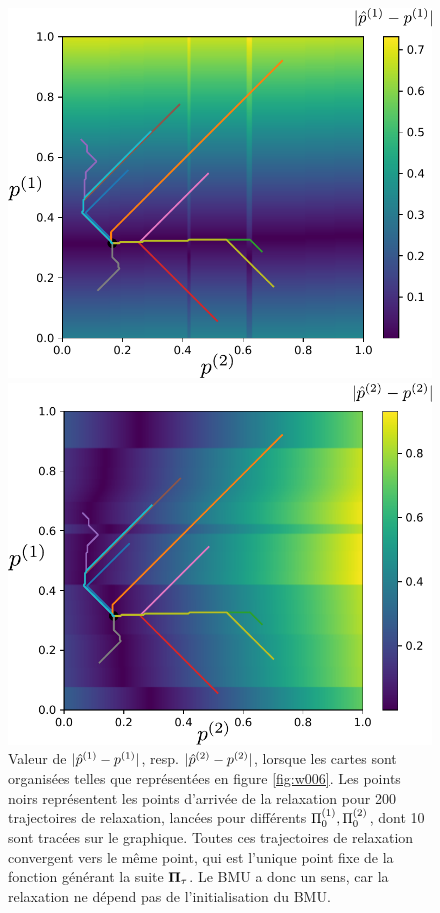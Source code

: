 \documentclass[../main]{subfiles}
\begin{document}
\begin{figure}
	\begin{minipage}{0.5\textwidth}
	\centering
	\includegraphics[width=\textwidth]{champ_X_006.pdf}
	\end{minipage}
	\begin{minipage}{0.5\textwidth}
	\centering
	\includegraphics[width=\textwidth]{champ_Y_006.pdf}
	\end{minipage}
	\caption{Valeur de $\lvert{\hat{p}}^{({1})} - p^{({1})}\rvert$, resp. $\lvert{\hat{p}}^{({2})} - p^{({2})}\rvert$, lorsque les cartes sont organisées telles que représentées en figure \ref{fig:w006}. 
	Les points noirs représentent les points d'arrivée de la relaxation pour 200 trajectoires de relaxation, lancées pour différents $\Pi_0^{({1})}, \Pi_0^{({2})}$, dont 10 sont tracées sur le graphique. Toutes ces trajectoires de relaxation convergent vers le même point, qui est l'unique point fixe de la fonction générant la suite $\mathbf{\Pi}_\tau$. Le BMU a donc un sens, car la relaxation ne dépend pas de l'initialisation du BMU.
	\label{fig:diff_relax_notraj}}
	\end{figure}
\end{document}
